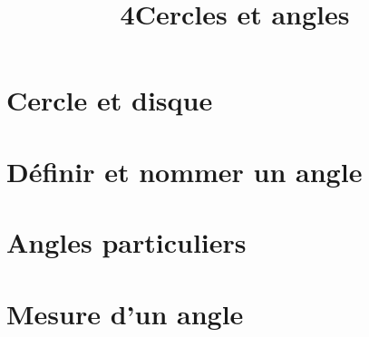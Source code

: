 \documentclass[12pt,a4paper]{article}
\date{}
\title{\textcircled{{\normalsize{4}}}Cercles et angles}
\begin{document}
	
	\maketitle



\section{Cercle et disque }



\section{Définir et nommer un angle}



\section{Angles particuliers}



\section{Mesure d'un angle}


\end{document}
